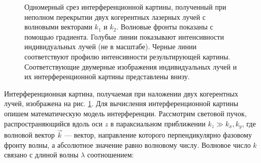 \begin{figure}[ht]
    \caption{Одномерный срез интерференционной картины, полученный при неполном перекрытии двух когерентных лазерных лучей с волновыми векторами $k_1$ и $k_2$. Волновые фронты показаны с помощью градиента. Голубые линии показывают интенсивности индивидуальных лучей (не в масштабе). Черные линии соответствуют профилю интенсивности результирующей картины. Соответствующие двумерные изображения индивидуальных лучей и их интерференционной картины представлены внизу.}\label{fig:two_beam_interf}
\end{figure}

Интерференционная картина, получаемая при наложении двух когерентных лучей, изображена на рис. \ref{fig:two_beam_interf}. Для вычисления интерференционной картины опишем математическую модель интерференции. Рассмотрим световой пучок, распространяющийся вдоль оси $z$ в параксиальном приближении $k_z \gg k_x, k_y$, где волновой вектор $\vec{k}$ --- вектор, направление которого перпендикулярно фазовому фронту волны, а абсолютное значение равно волновому числу. Волновое число $k$ связано с длиной волны $\lambda$ соотношением:

